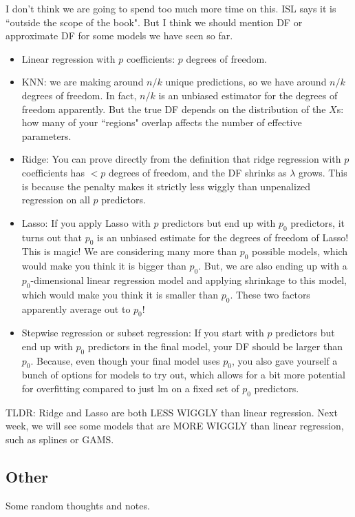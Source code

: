 I don't think we are going to spend too much more time on this. ISL says it is ``outside the scope of the book". But I think we should mention DF or approximate DF for some models we have seen so far. 
\begin{itemize}
\item Linear regression with $p$ coefficients: $p$ degrees of freedom. 
\item KNN: we are making around $n/k$ unique predictions, so we have around $n/k$ degrees of freedom. In fact, $n/k$ is an unbiased estimator for the degrees of freedom apparently. But the true DF depends on the distribution of the $X$s: how many of your ``regions" overlap affects the number of effective parameters. 
\item Ridge: You can prove directly from the definition that ridge regression with $p$ coefficients has $< p$ degrees of freedom, and the DF shrinks as $\lambda$ grows. This is because the penalty makes it strictly less wiggly than unpenalized regression on all $p$ predictors. 
\item Lasso: If you apply Lasso with $p$ predictors but end up with $p_0$ predictors, it turns out that $p_0$ is an unbiased estimate for the degrees of freedom of Lasso! This is magic! We are considering many more than $p_0$ possible models, which would make you think it is bigger than $p_0$. But, we are also ending up with a $p_0$-dimensional linear regression model and applying shrinkage to this model, which would make you think it is smaller than $p_0$. These two factors apparently average out to $p_0$! 
\item Stepwise regression or subset regression: If you start with $p$ predictors but end up with $p_0$ predictors in the final model, your DF should be larger than $p_0$. Because, even though your final model uses $p_0$, you also gave yourself a bunch of options for models to try out, which allows for a bit more potential for overfitting compared to just lm on a fixed set of $p_0$ predictors. 
\end{itemize}

TLDR: Ridge and Lasso are both LESS WIGGLY than linear regression. Next week, we will see some models that are MORE WIGGLY than linear regression, such as splines or GAMS. 

\subsection{Other}

Some random thoughts and notes. 

